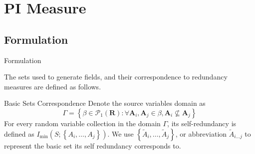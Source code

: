 \section{PI Measure}


\subsection{Formulation}

\begin{frame}{Formulation}

    The sets used to generate fields, and their correspondence to redundancy measures are defined as follows.
    \begin{block}{Basic Sets Correspondence}
        Denote the source variables domain as
        \begin{equation}
            \Gamma =  \left\{ \beta \in \mathcal{P}_{1}(\mathbf{R}) : \forall \mathbf{A}_i,\mathbf{A}_j \in \beta, \mathbf{A}_i \nsubseteq \mathbf{A}_j \right\}
        \end{equation}
        For every random variable collection in the domain $\Gamma$, its self-redundancy is defined as $I_{\min}\left(S;\left\{A_i, \ldots, A_j\right\}\right)$. We use $\left\{ \tilde{A}_{i}, \ldots, \tilde{A}_{j} \right\}$, or abbreviation $\tilde{A}_{i\ldots j}$ to represent the basic set its self redundancy corresponds to.
    \end{block}
\end{frame}

